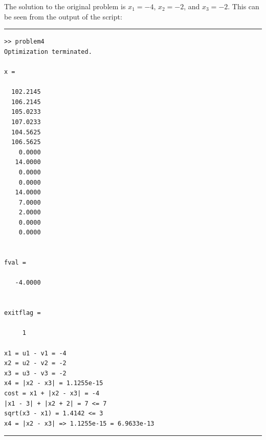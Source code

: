 \documentclass{article}
\begin{document}
The solution to the original problem is $x_1 = -4$, $x_2 = -2$, and $x_3 = -2$.
This can be seen from the output of the script:

\vspace{0.25in}
\hrule

\begin{verbatim}
>> problem4
Optimization terminated.

x =

  102.2145
  106.2145
  105.0233
  107.0233
  104.5625
  106.5625
    0.0000
   14.0000
    0.0000
    0.0000
   14.0000
    7.0000
    2.0000
    0.0000
    0.0000


fval =

   -4.0000


exitflag =

     1

x1 = u1 - v1 = -4
x2 = u2 - v2 = -2
x3 = u3 - v3 = -2
x4 = |x2 - x3| = 1.1255e-15
cost = x1 + |x2 - x3| = -4
|x1 - 3| + |x2 + 2| = 7 <= 7
sqrt(x3 - x1) = 1.4142 <= 3
x4 = |x2 - x3| => 1.1255e-15 = 6.9633e-13
\end{verbatim}

\vspace{0.25in}
\hrule
\end{document}
